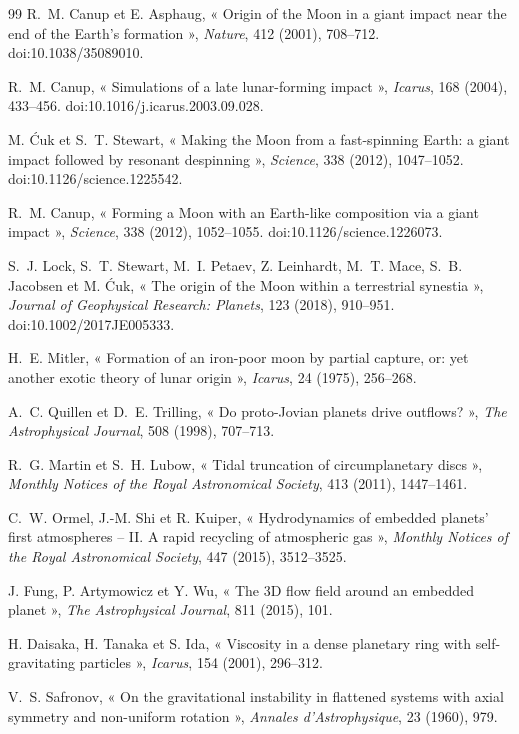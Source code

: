 \documentclass[11pt,a4paper,openany]{report}
\begin{document}
\begin{thebibliography}{99}
 R.~M. Canup et E. Asphaug, « Origin of the Moon in a giant impact near
the end of the Earth's formation », \emph{Nature}, 412 (2001), 708--712. doi:10.1038/35089010.

 R.~M. Canup, « Simulations of a late lunar-forming impact », \emph{Icarus},
168 (2004), 433--456. doi:10.1016/j.icarus.2003.09.028.

 M. Ćuk et S.~T. Stewart, « Making the Moon from a fast-spinning Earth:
a giant impact followed by resonant despinning », \emph{Science}, 338 (2012), 1047--1052.
doi:10.1126/science.1225542.

 R.~M. Canup, « Forming a Moon with an Earth-like composition via a giant
impact », \emph{Science}, 338 (2012), 1052--1055. doi:10.1126/science.1226073.

 S.~J. Lock, S.~T. Stewart, M.~I. Petaev, Z. Leinhardt, M.~T. Mace,
S.~B. Jacobsen et M. Ćuk, « The origin of the Moon within a terrestrial synestia », \emph{Journal
of Geophysical Research: Planets}, 123 (2018), 910--951. doi:10.1002/2017JE005333.

 H.~E. Mitler, « Formation of an iron-poor moon by partial capture, or: yet
another exotic theory of lunar origin », \emph{Icarus}, 24 (1975), 256--268.

 A.~C. Quillen et D.~E. Trilling, « Do proto-Jovian planets drive
outflows? », \emph{The Astrophysical Journal}, 508 (1998), 707--713.

 R.~G. Martin et S.~H. Lubow, « Tidal truncation of circumplanetary
discs », \emph{Monthly Notices of the Royal Astronomical Society}, 413 (2011), 1447--1461.

 C.~W. Ormel, J.-M. Shi et R. Kuiper, « Hydrodynamics of embedded planets' first
atmospheres -- II. A rapid recycling of atmospheric gas », \emph{Monthly Notices of the Royal
Astronomical Society}, 447 (2015), 3512--3525.

 J. Fung, P. Artymowicz et Y. Wu, « The 3D flow field around an embedded
planet », \emph{The Astrophysical Journal}, 811 (2015), 101.

 H. Daisaka, H. Tanaka et S. Ida, « Viscosity in a dense planetary ring with
self-gravitating particles », \emph{Icarus}, 154 (2001), 296--312.

 V.~S. Safronov, « On the gravitational instability in flattened systems with
axial symmetry and non-uniform rotation », \emph{Annales d'Astrophysique}, 23 (1960), 979.


\end{thebibliography}
\end{document}
